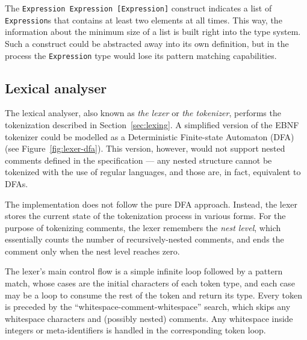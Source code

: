 \documentclass[english,bachelors,forcepolishlogotype]{wizthesis}
\begin{document}

The \texttt{Expression Expression [Expression]} construct indicates a list of
\texttt{Expression}s that contains at least two elements at all times. This way,
the information about the minimum size of a list is built right into the type
system. Such a construct could be abstracted away into its own definition, but
in the process the \texttt{Expression} type would lose its pattern matching
capabilities.

\subsection{Lexical analyser} \label{sbs:lexical-analyser}

The lexical analyser, also known as \emph{the lexer} or \emph{the tokenizer},
performs the tokenization described in Section~\ref{sec:lexing}. A simplified
version of the EBNF tokenizer could be modelled as a Deterministic Finite-state
Automaton (DFA) (see Figure~\ref{fig:lexer-dfa}). This version, however, would
not support nested comments defined in the specification --- any nested
structure cannot be tokenized with the use of regular languages, and those are,
in fact, equivalent to DFAs.

The implementation does not follow the pure DFA approach. Instead, the lexer
stores the current state of the tokenization process in various forms. For the
purpose of tokenizing comments, the lexer remembers the \emph{nest level}, which
essentially counts the number of recursively-nested comments, and ends the
comment only when the nest level reaches zero.

The lexer's main control flow is a simple infinite loop followed by a pattern
match, whose cases are the initial characters of each token type, and each
case may be a loop to consume the rest of the token and return its type.
Every token is preceded by the ``whitespace-comment-whitespace'' search, which
skips any whitespace characters and (possibly nested) comments. Any whitespace
inside integers or meta-identifiers is handled in the corresponding token loop.
\end{document}
